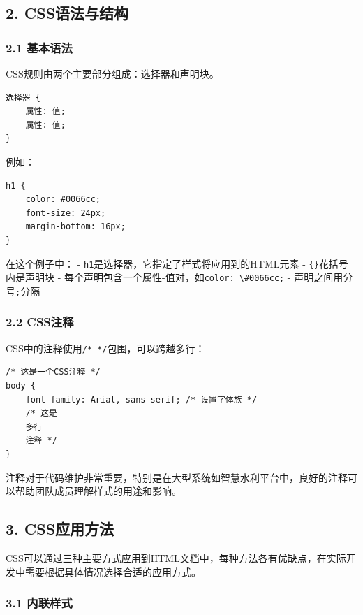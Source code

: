 \subsection{2. CSS语法与结构}\label{cssux8bedux6cd5ux4e0eux7ed3ux6784}

\subsubsection{2.1 基本语法}\label{ux57faux672cux8bedux6cd5}

CSS规则由两个主要部分组成：选择器和声明块。

\begin{lstlisting}
选择器 {
    属性: 值;
    属性: 值;
}
\end{lstlisting}

例如：

\begin{lstlisting}
h1 {
    color: #0066cc;
    font-size: 24px;
    margin-bottom: 16px;
}
\end{lstlisting}

在这个例子中： -
\passthrough{\lstinline!h1!}是选择器，它指定了样式将应用到的HTML元素 -
\passthrough{\lstinline!\{\}!}花括号内是声明块 -
每个声明包含一个属性-值对，如\passthrough{\lstinline!color: \#0066cc;!}
- 声明之间用分号\passthrough{\lstinline!;!}分隔

\subsubsection{2.2 CSS注释}\label{cssux6ce8ux91ca}

CSS中的注释使用\passthrough{\lstinline!/* */!}包围，可以跨越多行：

\begin{lstlisting}
/* 这是一个CSS注释 */
body {
    font-family: Arial, sans-serif; /* 设置字体族 */
    /* 这是
    多行
    注释 */
}
\end{lstlisting}

注释对于代码维护非常重要，特别是在大型系统如智慧水利平台中，良好的注释可以帮助团队成员理解样式的用途和影响。

\subsection{3. CSS应用方法}\label{cssux5e94ux7528ux65b9ux6cd5}

CSS可以通过三种主要方式应用到HTML文档中，每种方法各有优缺点，在实际开发中需要根据具体情况选择合适的应用方式。

\subsubsection{3.1 内联样式}\label{ux5185ux8054ux6837ux5f0f}

